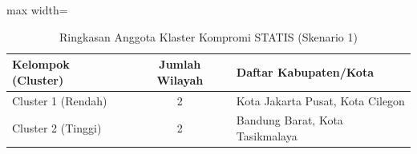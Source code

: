 \begin{table}[H]
\centering
\caption{Ringkasan Anggota Klaster Kompromi STATIS (Skenario 1)} \label{tab:sample1compromclust}
\begin{adjustbox}{max width=\textwidth}
\begin{tabular}{|p{3cm}|c|p{10cm}|}
\hline
\textbf{Kelompok (Cluster)} & \textbf{Jumlah Wilayah} & \textbf{Daftar Kabupaten/Kota} \\
\hline
Cluster 1 (Rendah) & 2 & Kota Jakarta Pusat, Kota Cilegon \\
\hline
Cluster 2 (Tinggi) & 2 & Bandung Barat, Kota Tasikmalaya \\
\hline
\end{tabular}
\end{adjustbox}
\end{table}
